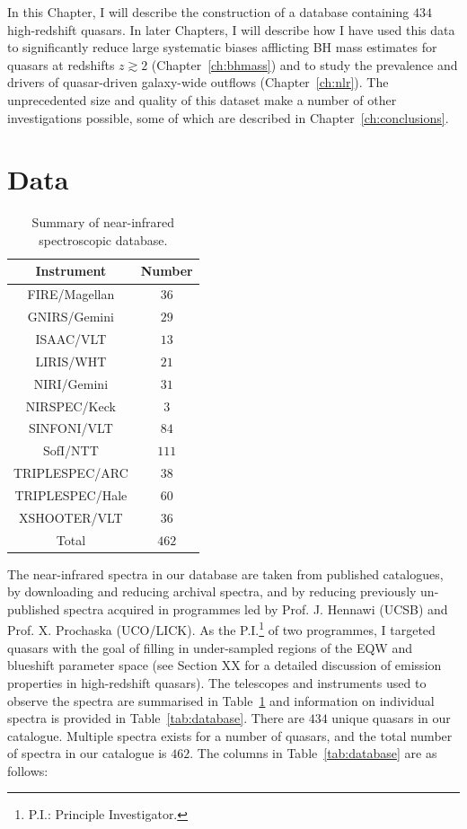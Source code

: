 In this Chapter, I will describe the construction of a database containing $434$ high-redshift quasars. 
In later Chapters, I will describe how I have used this data to significantly reduce large systematic biases afflicting BH mass estimates for quasars at redshifts $z \gtrsim 2$ (Chapter~\ref{ch:bhmass}) and to study the prevalence and drivers of quasar-driven galaxy-wide outflows (Chapter~\ref{ch:nlr}). 
The unprecedented size and quality of this dataset make a number of other investigations possible, some of which are described in Chapter~\ref{ch:conclusions}. 

\section{Data}

\begin{table}
  \footnotesize
  \centering
  \caption{Summary of near-infrared spectroscopic database.}
  \label{tab:data_summary}
    \begin{tabular}{cc} 
    \hline
    Instrument & Number \\  
    \hline
    FIRE/Magellan   & $36$ \\
    GNIRS/Gemini    & $29$ \\
    ISAAC/VLT       & $13$  \\
    LIRIS/WHT       & $21$  \\
    NIRI/Gemini     & $31$ \\
    NIRSPEC/Keck    & $3$   \\ 
    SINFONI/VLT     & $84$ \\
    SofI/NTT        & $111$ \\
    TRIPLESPEC/ARC  & $38$ \\
    TRIPLESPEC/Hale & $60$ \\
    XSHOOTER/VLT    & $36$  \\
    \hline
    Total & $462$ \\
    \hline
    \end{tabular}
\end{table}

The near-infrared spectra in our database are taken from published catalogues, by downloading and reducing
archival spectra, and by reducing previously un-published spectra acquired in programmes led by Prof. J. Hennawi (UCSB) and Prof. X. Prochaska (UCO/LICK). 
As the P.I.\footnote{P.I.: Principle Investigator.} of two programmes, I targeted quasars with the goal of filling in under-sampled regions of the  EQW and blueshift parameter space (see Section XX for a detailed discussion of  emission properties in high-redshift quasars).
The telescopes and instruments used to observe the spectra are summarised in Table~\ref{tab:data_summary} and information on individual spectra is provided in Table~\ref{tab:database}.
There are $434$ unique quasars in our catalogue. 
Multiple spectra exists for a number of quasars, and the total number of spectra in our catalogue is $462$. 
The columns in Table~\ref{tab:database} are as follows: 

